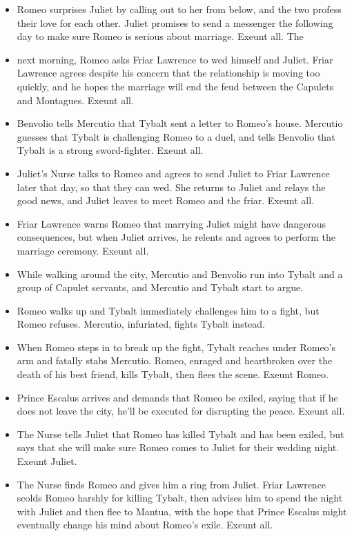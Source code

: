 \documentclass[10pt,a4paper]{article}
\begin{document}
\begin{itemize}[leftmargin=-0em]
\item Romeo surprises Juliet by calling out to her from below, and the two profess their love for each other. Juliet promises to send a messenger the following day to make sure Romeo is serious about marriage. Exeunt all.
The \item next morning, Romeo asks Friar Lawrence to wed himself and Juliet. Friar Lawrence agrees despite his concern that the relationship is moving too quickly, and he hopes the marriage will end the feud between the Capulets and Montagues. Exeunt all.
\item Benvolio tells Mercutio that Tybalt sent a letter to Romeo’s house. Mercutio guesses that Tybalt is challenging Romeo to a duel, and tells Benvolio that Tybalt is a strong sword-fighter. Exeunt all.
\item Juliet’s Nurse talks to Romeo and agrees to send Juliet to Friar Lawrence later that day, so that they can wed.
She returns to Juliet and relays the good news, and Juliet leaves to meet Romeo and the friar. Exeunt all.
\item Friar Lawrence warns Romeo that marrying Juliet might have dangerous consequences, but when Juliet arrives, he relents and agrees to perform the marriage ceremony. Exeunt all.
\item While walking around the city, Mercutio and Benvolio run into Tybalt and a group of Capulet servants, and Mercutio and Tybalt start to argue.
\item Romeo walks up and Tybalt immediately challenges him to a fight, but Romeo refuses. Mercutio, infuriated, fights Tybalt instead.
\item When Romeo steps in to break up the fight, Tybalt reaches under Romeo’s arm and fatally stabs Mercutio. Romeo, enraged and heartbroken over the death of his best friend, kills Tybalt, then flees the scene. Exeunt Romeo.
\item Prince Escalus arrives and demands that Romeo be exiled, saying that if he does not leave the city, he’ll be executed for disrupting the peace. Exeunt all.
\item The Nurse tells Juliet that Romeo has killed Tybalt and has been exiled, but says that she will make sure Romeo comes to Juliet for their wedding night. Exeunt Juliet.
\item The Nurse finds Romeo and gives him a ring from Juliet. Friar Lawrence scolds Romeo harshly for killing Tybalt, then advises him to spend the night with Juliet and then flee to Mantua, with the hope that Prince Escalus might eventually change his mind about Romeo’s exile. Exeunt all.

\end{itemize}
\end{document}
